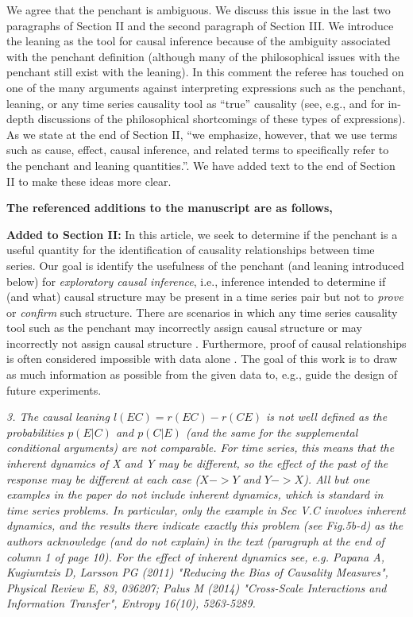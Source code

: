 \documentclass[a4paper,11pt]{article}
\begin{document}
We agree that the penchant is ambiguous.  We discuss this issue in the last two paragraphs of Section II and the second paragraph of Section III.  We introduce the leaning as the tool for causal inference because of the ambiguity associated with the penchant definition (although many of the philosophical issues with the penchant still exist with the leaning).  In this comment the referee has touched on one of the many arguments against interpreting expressions such as the penchant, leaning, or any time series causality tool as ``true'' causality (see, e.g., \cite{Pearl2000} and \cite{Illari2014} for in-depth discussions of the philosophical shortcomings of these types of expressions).  As we state at the end of Section II, ``we emphasize, however, that we use terms such as cause, effect, causal inference, and related terms to specifically refer to the penchant and leaning quantities.''.  We have added text to the end of Section II to make these ideas more clear.

{\bf The referenced additions to the manuscript are as follows,}

{\bf Added to Section II:} In this article, we seek to determine if the penchant is a useful quantity for the identification of causality relationships between time series.  Our goal is identify the usefulness of the penchant (and leaning introduced below) for {\em exploratory causal inference}, i.e., inference intended to determine if (and what) causal structure may be present in a time series pair but not to {\em prove} or {\em confirm} such structure.  There are scenarios in which any time series causality tool such as the penchant may incorrectly assign causal structure or may incorrectly not assign causal structure \cite{Illari2014}.  Furthermore, proof of causal relationships is often considered impossible with data alone \cite{Pearl2000,Illari2014,Rubin2015}.  The goal of this work is to draw as much information as possible from the given data to, e.g., guide the design of future experiments.

\vspace{0.5cm}
{\em 3. The causal leaning $l(EC)=r(EC)-r(CE)$ is not well defined as the probabilities $p(E|C)$ and $p(C|E)$ (and the same for the supplemental conditional arguments) are not comparable. For time series, this means that the inherent dynamics of X and Y may be different, so the effect of the past of the response may be different at each case ($X->Y$ and $Y->X$). All but one examples in the paper do not include inherent dynamics, which is standard in time series problems. In particular, only the example in Sec V.C involves inherent dynamics, and the results there indicate exactly this problem (see Fig.5b-d) as the authors acknowledge (and do not explain) in the text (paragraph at the end of column 1 of page 10). For the effect of inherent dynamics see, e.g. Papana A, Kugiumtzis D, Larsson PG (2011) "Reducing the Bias of Causality Measures", Physical Review E, 83, 036207; Palus M (2014) "Cross-Scale Interactions and Information Transfer", Entropy 16(10), 5263-5289.}
\vspace{0.5cm}
\end{document}
